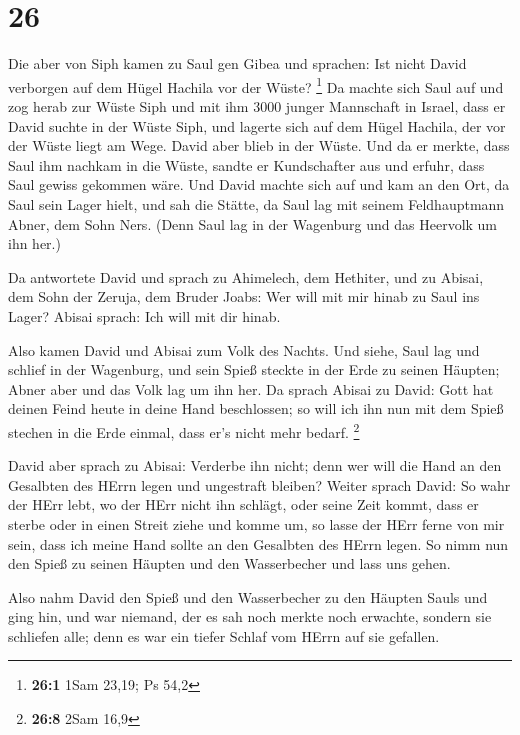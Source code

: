 \hypertarget{section-25}{%
\section{26}\label{section-25}}

 Die aber von Siph kamen zu Saul gen Gibea und sprachen:
Ist nicht David verborgen auf dem Hügel Hachila vor der Wüste?
\footnote{\textbf{26:1} 1Sam 23,19; Ps 54,2}  Da machte
sich Saul auf und zog herab zur Wüste Siph und mit ihm 3000 junger
Mannschaft in Israel, dass er David suchte in der Wüste Siph,
 und lagerte sich auf dem Hügel Hachila, der vor der Wüste
liegt am Wege. David aber blieb in der Wüste. Und da er merkte, dass
Saul ihm nachkam in die Wüste,  sandte er Kundschafter aus
und erfuhr, dass Saul gewiss gekommen wäre.  Und David
machte sich auf und kam an den Ort, da Saul sein Lager hielt, und sah
die Stätte, da Saul lag mit seinem Feldhauptmann Abner, dem Sohn Ners.
(Denn Saul lag in der Wagenburg und das Heervolk um ihn her.)

 Da antwortete David und sprach zu Ahimelech, dem
Hethiter, und zu Abisai, dem Sohn der Zeruja, dem Bruder Joabs: Wer will
mit mir hinab zu Saul ins Lager? Abisai sprach: Ich will mit dir hinab.

 Also kamen David und Abisai zum Volk des Nachts. Und
siehe, Saul lag und schlief in der Wagenburg, und sein Spieß steckte in
der Erde zu seinen Häupten; Abner aber und das Volk lag um ihn her.
 Da sprach Abisai zu David: Gott hat deinen Feind heute in
deine Hand beschlossen; so will ich ihn nun mit dem Spieß stechen in die
Erde einmal, dass er's nicht mehr bedarf. \footnote{\textbf{26:8} 2Sam
  16,9}

 David aber sprach zu Abisai: Verderbe ihn nicht; denn wer
will die Hand an den Gesalbten des HErrn legen und ungestraft bleiben?
 Weiter sprach David: So wahr der HErr lebt, wo der HErr
nicht ihn schlägt, oder seine Zeit kommt, dass er sterbe oder in einen
Streit ziehe und komme um,  so lasse der HErr ferne von
mir sein, dass ich meine Hand sollte an den Gesalbten des HErrn legen.
So nimm nun den Spieß zu seinen Häupten und den Wasserbecher und lass
uns gehen.

 Also nahm David den Spieß und den Wasserbecher zu den
Häupten Sauls und ging hin, und war niemand, der es sah noch merkte noch
erwachte, sondern sie schliefen alle; denn es war ein tiefer Schlaf vom
HErrn auf sie gefallen.

